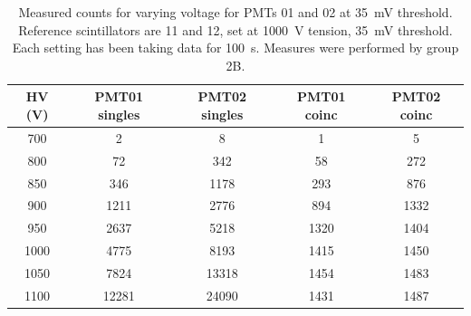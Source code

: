 \documentclass[../main.tex]{subfiles}
\begin{document}
        \FloatBarrier
    \begin{table}[t!]
    \centering
    \caption{Measured counts for varying voltage for PMTs 01 and 02 at \SI{35}{\milli \volt} threshold. Reference scintillators are 11 and 12, set at \SI{1000}{\volt} tension, \SI{35}{\milli \volt} threshold. Each setting has been taking data for \SI{100}{\second}. Measures were performed by group 2B.}
    \label{tab:HV2B}
    \begin{tabular}{|c|cc|cc|}
    \hline
    HV (V)  & PMT01 singles & PMT02 singles & PMT01 coinc & PMT02 coinc \\ \hline
    \phantom{0}700  & \phantom{0000}2             & \phantom{0000}8             & \phantom{000}1           & \phantom{000}5           \\
    \phantom{0}800  & \phantom{000}72            & \phantom{00}342           & \phantom{00}58          & \phantom{0}272         \\
    \phantom{0}850  & \phantom{00}346           & \phantom{0}1178          & \phantom{0}293         & \phantom{0}876         \\
    \phantom{0}900  & \phantom{0}1211          & \phantom{0}2776          & \phantom{0}894         & 1332        \\
    \phantom{0}950  & \phantom{0}2637          & \phantom{0}5218          & 1320        & 1404        \\
    1000 & \phantom{0}4775          & \phantom{0}8193          & 1415        & 1450        \\
    1050 & \phantom{0}7824          & 13318         & 1454        & 1483        \\
    1100 & 12281         & 24090         & 1431        & 1487        \\ \hline
    \end{tabular}%
    \end{table}
    
\end{document}
